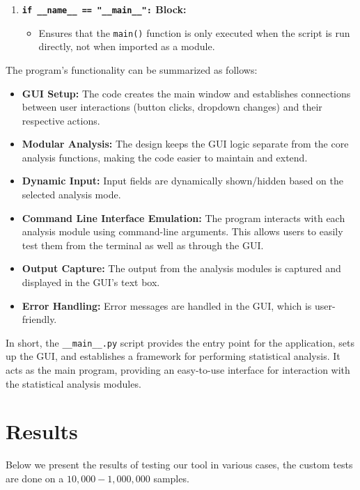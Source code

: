 \documentclass{article}
\begin{document}
\begin{enumerate}
    \item \textbf{\texttt{if \_\_name\_\_ == "\_\_main\_\_":} Block:}
    \begin{itemize}
         \item Ensures that the \texttt{main()} function is only executed when the script is run directly, not when imported as a module.
    \end{itemize}
\end{enumerate}

The program’s functionality can be summarized as follows:

\begin{itemize}
    \item \textbf{GUI Setup:} The code creates the main window and establishes connections between user interactions (button clicks, dropdown changes) and their respective actions.
    \item \textbf{Modular Analysis:} The design keeps the GUI logic separate from the core analysis functions, making the code easier to maintain and extend.
    \item \textbf{Dynamic Input:} Input fields are dynamically shown/hidden based on the selected analysis mode.
    \item \textbf{Command Line Interface Emulation:} The program interacts with each analysis module using command-line arguments. This allows users to easily test them from the terminal as well as through the GUI.
    \item \textbf{Output Capture:} The output from the analysis modules is captured and displayed in the GUI's text box.
    \item \textbf{Error Handling:} Error messages are handled in the GUI, which is user-friendly.
\end{itemize}

In short, the \texttt{\_\_main\_\_.py} script provides the entry point for the application, sets up the GUI, and establishes a framework for performing statistical analysis. It acts as the main program, providing an easy-to-use interface for interaction with the statistical analysis modules.
\newpage
\section{Results}

Below we present the results of testing our tool in various cases, the custom tests are done on a $10,000-1,000,000$ samples.
\end{document}
